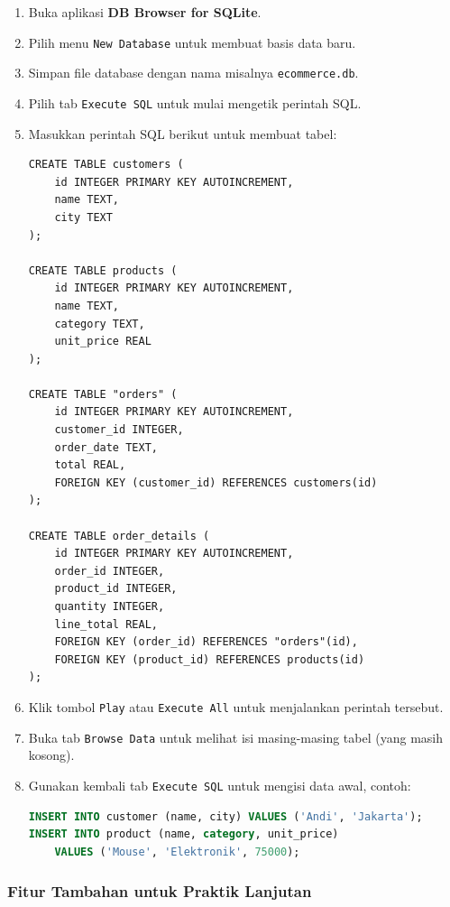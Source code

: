 \begin{enumerate}
\item Buka aplikasi \textbf{DB Browser for SQLite}.
\item Pilih menu \texttt{New Database} untuk membuat basis data baru.
\item Simpan file database dengan nama misalnya \texttt{ecommerce.db}.
\item Pilih tab \texttt{Execute SQL} untuk mulai mengetik perintah SQL.
\item Masukkan perintah SQL berikut untuk membuat tabel:

\begin{lstlisting}[style=SqlStyle]
CREATE TABLE customers (
	id INTEGER PRIMARY KEY AUTOINCREMENT,
	name TEXT,
	city TEXT
);

CREATE TABLE products (
	id INTEGER PRIMARY KEY AUTOINCREMENT,
	name TEXT,
	category TEXT,
	unit_price REAL
);

CREATE TABLE "orders" (
	id INTEGER PRIMARY KEY AUTOINCREMENT,
	customer_id INTEGER,
	order_date TEXT,
	total REAL,
	FOREIGN KEY (customer_id) REFERENCES customers(id)
);

CREATE TABLE order_details (
	id INTEGER PRIMARY KEY AUTOINCREMENT,
	order_id INTEGER,
	product_id INTEGER,
	quantity INTEGER,
	line_total REAL,
	FOREIGN KEY (order_id) REFERENCES "orders"(id),
	FOREIGN KEY (product_id) REFERENCES products(id)
);
\end{lstlisting}

\item Klik tombol \texttt{Play} atau \texttt{Execute All} untuk menjalankan perintah tersebut.
\item Buka tab \texttt{Browse Data} untuk melihat isi masing-masing tabel (yang masih kosong).
\item Gunakan kembali tab \texttt{Execute SQL} untuk mengisi data awal, contoh:

\begin{lstlisting}[language=SQL]
INSERT INTO customer (name, city) VALUES ('Andi', 'Jakarta');
INSERT INTO product (name, category, unit_price) 
	VALUES ('Mouse', 'Elektronik', 75000);
\end{lstlisting}

\end{enumerate}

\subsubsection{Fitur Tambahan untuk Praktik Lanjutan}

